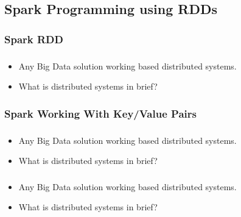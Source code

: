 \subsection{Spark Programming using RDDs}
\subsubsection{Spark RDD}

\begin{frame}
  \frametitle{\subsecname}
	\begin{itemize}[<+->]
		\item Any Big Data solution working based distributed systems.
		\item What is distributed systems in brief?
	\end{itemize}
\end{frame}

\subsubsection{Spark Working With Key/Value Pairs}

\begin{frame}
  \frametitle{\subsecname}
	\begin{itemize}[<+->]
		\item Any Big Data solution working based distributed systems.
		\item What is distributed systems in brief?
	\end{itemize}
\end{frame}



\begin{frame}
  \frametitle{\subsecname}
	\begin{itemize}[<+->]
		\item Any Big Data solution working based distributed systems.
		\item What is distributed systems in brief?
	\end{itemize}
\end{frame}


